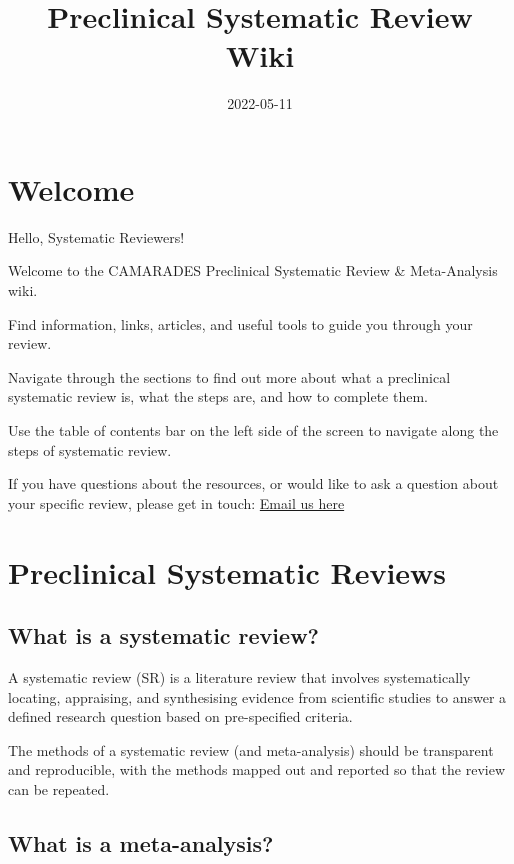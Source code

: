 \documentclass[
]{book}
\title{Preclinical Systematic Review Wiki}
\author{}
\date{\vspace{-2.5em}2022-05-11}
\begin{document}
\maketitle

{
\setcounter{tocdepth}{1}
\tableofcontents
}
\hypertarget{welcome}{%
\chapter{Welcome}\label{welcome}}

Hello, Systematic Reviewers!

Welcome to the CAMARADES Preclinical Systematic Review \& Meta-Analysis wiki.

Find information, links, articles, and useful tools to guide you through your review.

Navigate through the sections to find out more about what a preclinical systematic review is, what the steps are, and how to complete them.

Use the table of contents bar on the left side of the screen to navigate along the steps of systematic review.

If you have questions about the resources, or would like to ask a question about your specific review, please get in touch:
\href{mailto:CAMARADES.berlin@charite.de}{Email us here}

\hypertarget{intro}{%
\chapter{Preclinical Systematic Reviews}\label{intro}}

\hypertarget{what-is-a-systematic-review}{%
\section{What is a systematic review?}\label{what-is-a-systematic-review}}

A systematic review (SR) is a literature review that involves systematically locating, appraising, and synthesising evidence from scientific studies to answer a defined research question based on pre-specified criteria.

The methods of a systematic review (and meta-analysis) should be transparent and reproducible, with the methods mapped out and reported so that the review can be repeated.

\hypertarget{what-is-a-meta-analysis}{%
\section{What is a meta-analysis?}\label{what-is-a-meta-analysis}}
\end{document}
